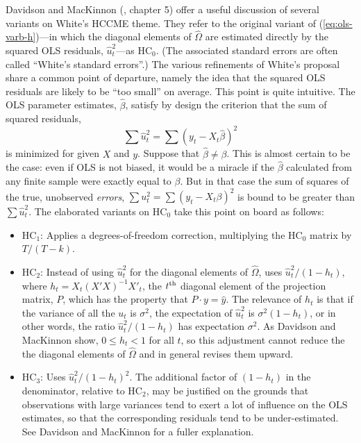 Davidson and MacKinnon (\citeyear{davidson-mackinnon04}, chapter 5)
offer a useful discussion of several variants on White's HCCME
theme. They refer to the original variant of
(\ref{eq:ols-varb-h})---in which the diagonal elements of
$\hat{\Omega}$ are estimated directly by the squared OLS residuals,
$\hat{u}^2_t$---as HC$_0$.  (The associated standard errors are often
called ``White's standard errors''.)  The various refinements of
White's proposal share a common point of departure, namely the idea
that the squared OLS residuals are likely to be ``too small'' on
average.  This point is quite intuitive.  The OLS parameter estimates,
$\hat{\beta}$, satisfy by design the criterion that the sum of squared
residuals,
%
\[
\sum \hat{u}^2_t = \sum \left( y_t - X_t \hat{\beta} \right)^2
\]
%
is minimized for given $X$ and $y$.  Suppose that $\hat{\beta} \neq
\beta$.  This is almost certain to be the case: even if OLS is not
biased, it would be a miracle if the $\hat{\beta}$ calculated from any
finite sample were exactly equal to $\beta$.  But in that case the sum
of squares of the true, unobserved \textit{errors}, $\sum u^2_t = \sum
(y_t - X_t \beta)^2$ is bound to be greater than $\sum \hat{u}^2_t$.
The elaborated variants on HC$_0$ take this point on board as follows:
%
\begin{itemize}
\item HC$_1$: Applies a degrees-of-freedom correction, multiplying the
  HC$_0$ matrix by $T/(T-k)$.
\item HC$_2$: Instead of using $\hat{u}^2_t$ for the diagonal elements
  of $\hat{\Omega}$, uses $\hat{u}^2_t/(1-h_t)$, where $h_t =
  X_t(X'X)^{-1}X'_t$, the $t^{\rm th}$ diagonal element of the projection
  matrix, $P$, which has the property that $P\cdot y = \hat{y}$.  The
  relevance of $h_t$ is that if the variance of all the $u_t$ is
  $\sigma^2$, the expectation of $\hat{u}^2_t$ is $\sigma^2(1-h_t)$,
  or in other words, the ratio $\hat{u}^2_t/(1-h_t)$ has expectation
  $\sigma^2$.  As Davidson and MacKinnon show, $0\leq h_t <1$ for all
  $t$, so this adjustment cannot reduce the the diagonal elements of
  $\hat{\Omega}$ and in general revises them upward.
\item HC$_3$: Uses $\hat{u}^2_t/(1-h_t)^2$.  The additional factor of
  $(1-h_t)$ in the denominator, relative to HC$_2$, may be justified
  on the grounds that observations with large variances tend to exert
  a lot of influence on the OLS estimates, so that the corresponding
  residuals tend to be under-estimated.  See Davidson and MacKinnon
  for a fuller explanation.
\end{itemize}

